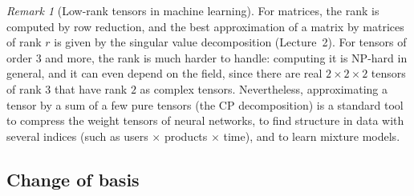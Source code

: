 \documentclass[11pt]{article}
\theoremstyle{definition}
\theoremstyle{plain}
\theoremstyle{remark}
\newtheorem{remark}[definition]{Remark}
\begin{document}
\begin{remark}[Low-rank tensors in machine learning]
    For matrices, the rank is computed by row reduction, and the best approximation of a matrix by matrices of rank $r$ is given by the singular value decomposition (Lecture~2). For tensors of order $3$ and more, the rank is much harder to handle: computing it is NP-hard in general, and it can even depend on the field, since there are real $2 \times 2 \times 2$ tensors of rank $3$ that have rank $2$ as complex tensors. Nevertheless, approximating a tensor by a sum of a few pure tensors (the CP decomposition) is a standard tool to compress the weight tensors of neural networks, to find structure in data with several indices (such as users $\times$ products $\times$ time), and to learn mixture models.
\end{remark}

\subsection{Change of basis}\label{subsec:tensor-basis-change}
\end{document}
